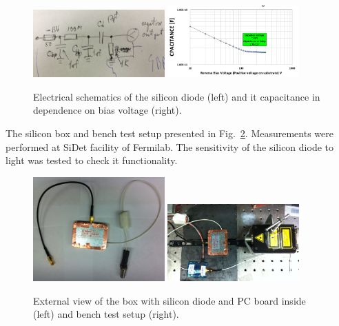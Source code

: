 \documentclass[12pt]{article}
\begin{document}
\begin{figure}[htbp] 
\centering
\includegraphics[width=0.45\textwidth]{plots/SiliconDiodeDiagram.png} 
\includegraphics[width=0.45\textwidth]{plots/SiliconDiodeCV.png} 
\caption{Electrical schematics of the silicon diode (left) and it capacitance in dependence on bias voltage (right). } 
\label{fig:SiliconDiode} 
\end{figure} 
The silicon box and bench test setup presented in Fig.~\ref{fig:SiliconPad}. Measurements were performed at SiDet facility of Fermilab. The sensitivity of the silicon diode to light was tested to check it functionality.\begin{figure}[htbp] 
\centering
\includegraphics[width=0.45\textwidth]{plots/SiliconPadExternalView.png} 
\includegraphics[width=0.45\textwidth]{plots/SiliconPadBench.png} 
\caption{External view of the box with silicon diode and PC board inside (left) and bench test setup (right).} 
\label{fig:SiliconPad} 
\end{figure} 
\end{document}
